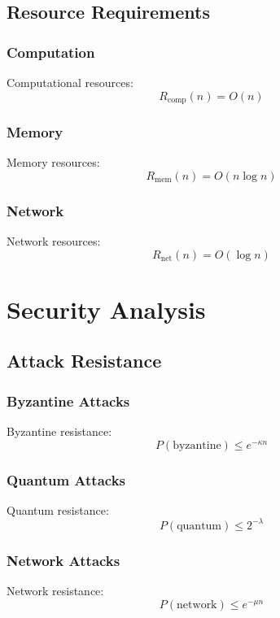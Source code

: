\documentclass[12pt]{article}
\begin{document}
\subsection{Resource Requirements}
\subsubsection{Computation}
Computational resources:
\begin{equation}
R_{\text{comp}}(n) = O(n)
\end{equation}
\subsubsection{Memory}
Memory resources:
\begin{equation}
R_{\text{mem}}(n) = O(n\log n)
\end{equation}
\subsubsection{Network}
Network resources:
\begin{equation}
R_{\text{net}}(n) = O(\log n)
\end{equation}
\section{Security Analysis}
\subsection{Attack Resistance}
\subsubsection{Byzantine Attacks}
Byzantine resistance:
\begin{equation}
P(\text{byzantine}) \leq e^{-\kappa n}
\end{equation}
\subsubsection{Quantum Attacks}
Quantum resistance:
\begin{equation}
P(\text{quantum}) \leq 2^{-\lambda}
\end{equation}
\subsubsection{Network Attacks}
Network resistance:
\begin{equation}
P(\text{network}) \leq e^{-\mu n}
\end{equation}
\end{document}
